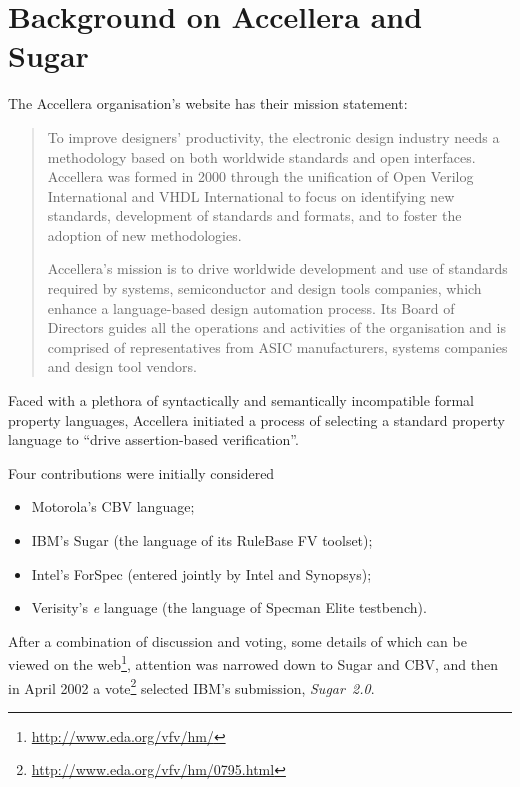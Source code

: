 \documentclass{llncs}
\newcommand\Sugar{{\it{Sugar~2.0}}\xspace}
\begin{document}
\section{Background on Accellera and Sugar}

The Accellera organisation's website has their mission statement:

{\sl\begin{quote}

To improve designers' productivity, the electronic design industry
needs a methodology based on both worldwide standards and open
interfaces. Accellera was formed in 2000 through the unification of
Open Verilog International and VHDL International to focus on
identifying new standards, development of standards and formats, and
to foster the adoption of new methodologies.

Accellera's mission is to drive worldwide development and use of
standards required by systems, semiconductor and design tools
companies, which enhance a language-based design automation
process. Its Board of Directors guides all the operations and
activities of the organisation and is comprised of representatives
from ASIC manufacturers, systems companies and design tool vendors.
\end{quote}}


Faced with a plethora of syntactically and semantically incompatible
formal property languages, Accellera initiated a process of selecting
a standard property language to ``drive assertion-based verification''.

\newpage

Four contributions were initially considered

\begin{itemize}

\item Motorola's CBV language;

\item IBM's Sugar (the language of its RuleBase FV toolset);

\item Intel's ForSpec (entered jointly by Intel and Synopsys);

\item Verisity's {\it e} language (the language of Specman Elite testbench).

\end{itemize}

After a combination of discussion and voting, some details of which
can be viewed on the web\footnote{\url{http://www.eda.org/vfv/hm/}},
attention was narrowed down to Sugar and CBV, and then in April
2002 a vote\footnote{\url{http://www.eda.org/vfv/hm/0795.html}}
selected IBM's submission, \Sugar.
\end{document}
